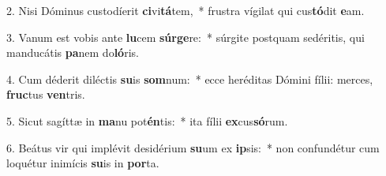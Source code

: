 2. Nisi Dóminus custodíerit \textbf{ci}vi\textbf{tá}tem,~*  frustra vígilat qui cus\textbf{tó}dit \textbf{e}am.\

3. Vanum est vobis ante \textbf{lu}cem \textbf{súr}\textbf{ge}re:~*  súrgite postquam sedéritis, qui manducátis \textbf{pa}nem do\textbf{ló}ris.\

4. Cum déderit diléctis \textbf{su}is \textbf{som}num:~*  ecce heréditas Dómini fílii: merces, \textbf{fruc}tus \textbf{ven}tris.\

5. Sicut sagíttæ in \textbf{ma}nu pot\textbf{én}tis:~*  ita fílii \textbf{ex}cus\textbf{só}rum.\

6. Beátus vir qui implévit desidérium \textbf{su}um ex \textbf{ip}sis:~*  non confundétur cum loquétur inimícis \textbf{su}is in \textbf{por}ta.\


